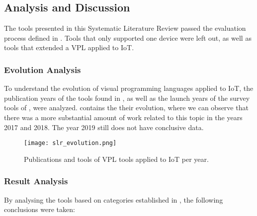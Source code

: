 \subsection{Analysis and Discussion}\label{sec:slr_discussion}

The tools presented in this Systematic Literature Review passed the evaluation process defined in . Tools that only supported one device were left out, as well as tools that extended a VPL applied to IoT. 

\subsubsection{Evolution Analysis}\label{sec:articles_nr_analysis}

To understand the evolution of visual programming languages applied to IoT, the publication years of the tools found in , as well as the launch years of the survey tools of , were analyzed.  contains the their evolution, where we can observe that there was a more substantial amount of work related to this topic in the years 2017 and 2018. The year 2019 still does not have conclusive data.

\begin{figure}[h]
\centering
\texttt{[image: slr\_evolution.png]}
\caption{Publications and tools of VPL tools applied to IoT per year.}\label{fig:slr_evolution}
\end{figure}

\subsubsection{Result Analysis}\label{sec:result_analysis}

By analysing the tools based on categories established in , the following conclusions were taken:

